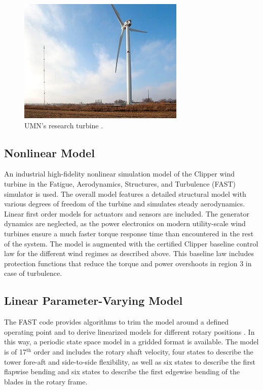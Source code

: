 \documentclass[times]{weauth}
\begin{document}
\begin{figure}[tb]
	\centering
	\includegraphics[width=0.5\linewidth]{wt2.jpg}		
	\caption{UMN's research turbine \cite{eolos}.
	}
	\label{fig:wt}
\end{figure}

\subsection*{Nonlinear Model} An industrial high-fidelity nonlinear simulation model
of the Clipper wind turbine in the Fatigue, Aerodynamics, Structures, and Turbulence (FAST)
simulator \cite{Fastv7_05} is used. The overall model features a detailed structural
model with various degrees of freedom of the turbine and simulates steady aerodynamics. Linear
first order models for actuators and sensors are included. The generator
dynamics are neglected, as the power electronics on modern utility-scale wind
turbines ensure a much faster torque response time than encountered in the rest
of the system.
The model is augmented with the certified  Clipper baseline control law for the different
wind regimes as described above. This baseline law includes protection functions
that reduce the torque and power overshoots in region 3 in case of turbulence.

\subsection*{Linear Parameter-Varying Model} The FAST code provides algorithms to trim the model around a defined operating point and to derive linearized models for different rotary positions \cite{Fastv7_05}. In this way, a periodic state space model in
a gridded format is available.
The model is of 17$^{\text{th}}$ order and includes the rotary shaft velocity,
four states to describe the tower fore-aft and side-to-side flexibility, as well
as six  states to describe the first flapwise bending and six states to describe
the first edgewise bending of the blades in the rotary frame.
\end{document}
